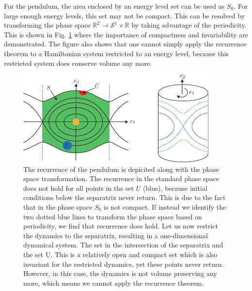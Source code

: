 \begin{ex}
	For the pendulum, the area enclosed by an energy level set can be used as $S_0$. For large enough energy levels, this set may not be compact. This can be resolved by transforming the phase space $\mathbb{R}^{2}\to \mathcal{S}^{1}\times \mathbb{R}$ by taking advantage of the periodicity. This is shown in Fig. \ref{fig:pendulum_recurrence} where the importance of compactness and invariability are demonstrated. The figure also shows that one cannot simply apply the recurrence theorem to a Hamiltonian system restricted to an energy level, because this restricted system does conserve volume any more.  
	\begin{figure}[h!]
		\centering
		\includegraphics[width=0.9\textwidth]{figures/ch8/12pendulum_recurrence.pdf}
		\caption{The recurrence of the pendulum is depicited along with the phase space transformation. The recurrence in the standard phase space does not hold for all points in the set $U$ (blue), because initial conditions below the separatrix never return. This is due to the fact that in the phase space $S_0$ is not compact. If instead we identify the two dotted blue lines to transform the phase space based on periodicity, we find that recurrence does hold. Let us now restrict the dynamics to the separatrix, resulting in a one-dimensional dynamical system. The set in the intersection of the separatrix and the set U. This is a relatively open and compact set which is also invariant for the restricted dynamics, yet these points never return. However, in this case, the dynamics is not volume preserving any more, which means we cannot apply the recurrence theorem.}
		\label{fig:pendulum_recurrence}
	\end{figure}
\end{ex}

